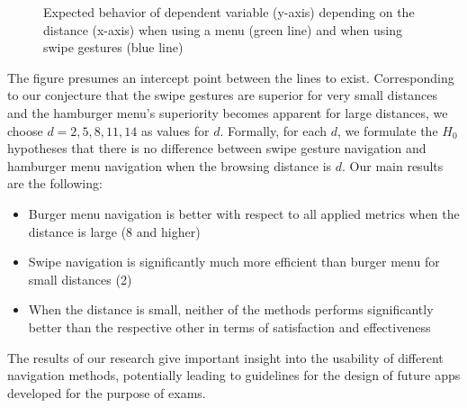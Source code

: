 \documentclass{sig-alternate-05-2015}
\begin{document}
\begin{figure}
	\caption{Expected behavior of dependent variable (y-axis) depending on the distance (x-axis) when using a menu (green line) and when using swipe gestures (blue line)}
\end{figure}
The figure presumes an intercept point between the lines to exist. Corresponding to our conjecture that the swipe gestures are superior for very small distances and the hamburger menu's superiority
becomes apparent for large distances, we choose $d = 2, 5, 8, 11, 14$ as values for $d$. Formally, for each $d$, we formulate the $H_0$ hypotheses that there is no difference between swipe gesture navigation
and hamburger menu navigation when the browsing distance is $d$. 
Our main results are the following:
\begin{itemize}
  \item Burger menu navigation is better with respect to all applied metrics when the distance is large (8 and higher)
  \item Swipe navigation is significantly much more efficient than burger menu for small distances (2)
  \item When the distance is small, neither of the methods performs significantly better than the respective other in terms of satisfaction and effectiveness  
\end{itemize}
The results of our research give important insight into the usability of
different navigation methods, potentially leading to guidelines for the design
of future apps developed for the purpose of exams.
\end{document}
